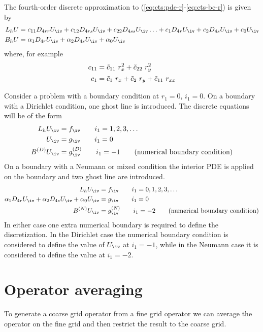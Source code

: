 \documentclass[12pt]{article}
\begin{document}
The fourth-order discrete approximation to (\ref{eq:cts:pde-r}-\ref{eq:cts-bc-r})
is given by
\begin{align*}
   L_h U &= c_{11} D_{4rr} U_\iv + c_{12} D_{4rs} U_\iv + c_{22} D_{4ss} U_\iv \ldots
          + c_{1} D_{4r} U_\iv + c_{2} D_{4s} U_\iv + c_{0} U_\iv         \\        
   B_h U &= \alpha_1 D_{4r} U_\iv + \alpha_2 D_{4s} U_\iv + \alpha_0 U_\iv   
\end{align*}
where, for example
\begin{align*}
  c_{11} &=  \tilde{c}_{11}~r_x^2 + \tilde{c}_{22}~ r_y^2  \\
  c_1    &=   \tilde{c}_1~r_x + \tilde{c}_2~r_y + \tilde{c}_{11}~r_{xx} 
\end{align*}

Consider a problem with a boundary condition at $r_1=0$, $i_1=0$. 
On a boundary with a Dirichlet condition, one ghost line is introduced. 
The discrete equations will be of the form
\begin{align*}
   L_h U_\iv &= f_\iv \qquad i_1=1,2,3,\ldots \\
      U_\iv & = g_\iv   \qquad i_1=0 \\
      B^{(D)} U_\iv & = g_\iv^{(D)}  \qquad i_1=-1 \qquad\mbox{(numerical boundary condition)}
\end{align*}
On a boundary with a Neumann or mixed condition the interior PDE is applied on the boundary
and two ghost line are introduced.
\begin{align*}
   L_h U_\iv &= f_\iv \qquad i_1=0,1,2,3,\ldots \\
      \alpha_1 D_{4r} U_\iv + \alpha_2 D_{4s} U_\iv + \alpha_0 U_\iv &= g_\iv   \qquad i_1=0 \\
      B^{(N)} U_\iv & = g_\iv^{(N)}  \qquad i_1=-2 \qquad\mbox{(numerical boundary condition)}
\end{align*}
In either case one extra numerical boundary is required to define the discretization.
In the Dirichlet case the numerical boundary condition is considered to define the value of $U_\iv$
at $i_1=-1$, while in the Neumann case it is considered to define the value at $i_1=-2$.

\clearpage
\section{Operator averaging}

To generate a coarse grid operator from a fine grid operator we can
average the operator on the fine grid and then restrict the result
to the coarse grid.
\end{document}
